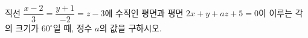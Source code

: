 직선 $\dfrac{x-2}{3}=\dfrac{y+1}{-2}=z-3$에 수직인 평면과 평면 $2x+y+az+5=0$이 이루는 각의 크기가 $60^\circ$일 때, 정수 $a$의 값을 구하시오.
